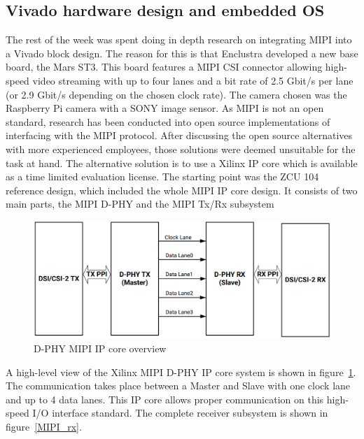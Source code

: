 \subsection{Vivado hardware design and embedded \acs{OS}}
The rest of the week was spent doing in depth research on integrating \ac{MIPI} into a Vivado block design. The reason for this is that Enclustra developed a new base board, the Mars ST3. This board features a \ac{MIPI} \ac{CSI} connector allowing high-speed video streaming with up to four lanes and a bit rate of 2.5 Gbit/s per lane (or 2.9 Gbit/s depending on the chosen clock rate). The camera chosen was the Raspberry Pi camera with a SONY image sensor. As \ac{MIPI} is not an open standard, research has been conducted into open source implementations of interfacing with the \ac{MIPI} protocol. After discussing the open source alternatives with more experienced employees, those solutions were deemed unsuitable for the task at hand. The alternative solution is to use a Xilinx \ac{IP} core which is available as a time limited evaluation license. The starting point was the ZCU 104 reference design, which included the whole \ac{MIPI} \ac{IP} core design. It consists of two main parts, the \ac{MIPI} D-PHY and the \ac{MIPI} Tx/Rx subsystem
\begin{figure}[!htb]
	\centering
		\includegraphics[width=\textwidth]{bilder/MIPI_dphy.png}
		\caption{D-PHY \acs{MIPI} \acs{IP} core overview~\cite{mipi-dphy}}
		\label{fig:mipi_dphy}
\end{figure}
A high-level view of the Xilinx \ac{MIPI} D-PHY \ac{IP} core system is shown in figure~\ref{fig:mipi_dphy}. The communication takes place between a Master and Slave with one clock lane and up to 4 data lanes. This \ac{IP} core allows proper communication on this high-speed I/O interface standard. The complete receiver subsystem is shown in figure~\ref{MIPI_rx}.
